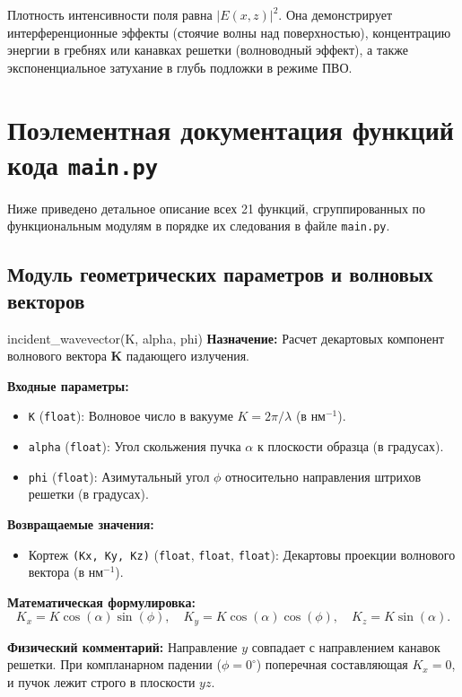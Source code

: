 \documentclass[a4paper,11pt]{article}
\begin{document}
Плотность интенсивности поля равна $|E(x, z)|^2$. Она демонстрирует интерференционные эффекты (стоячие волны над поверхностью), концентрацию энергии в гребнях или канавках решетки (волноводный эффект), а также экспоненциальное затухание в глубь подложки в режиме ПВО.

\newpage
\section{Поэлементная документация функций кода \texttt{main.py}}

Ниже приведено детальное описание всех 21 функций, сгруппированных по функциональным модулям в порядке их следования в файле \texttt{main.py}.

\subsection{Модуль геометрических параметров и волновых векторов}

\begin{funcbox}{incident\_wavevector(K, alpha, phi)}
\textbf{Назначение:} Расчет декартовых компонент волнового вектора $\mathbf{K}$ падающего излучения.

\textbf{Входные параметры:}
\begin{itemize}
    \item \texttt{K} (\texttt{float}): Волновое число в вакууме $K = 2\pi / \lambda$ (в $\text{нм}^{-1}$).
    \item \texttt{alpha} (\texttt{float}): Угол скольжения пучка $\alpha$ к плоскости образца (в градусах).
    \item \texttt{phi} (\texttt{float}): Азимутальный угол $\phi$ относительно направления штрихов решетки (в градусах).
\end{itemize}

\textbf{Возвращаемые значения:}
\begin{itemize}
    \item Кортеж \texttt{(Kx, Ky, Kz)} (\texttt{float}, \texttt{float}, \texttt{float}): Декартовы проекции волнового вектора (в $\text{нм}^{-1}$).
\end{itemize}

\textbf{Математическая формулировка:}
\begin{equation*}
K_x = K \cos(\alpha) \sin(\phi), \quad K_y = K \cos(\alpha) \cos(\phi), \quad K_z = K \sin(\alpha).
\end{equation*}

\textbf{Физический комментарий:} Направление $y$ совпадает с направлением канавок решетки. При компланарном падении ($\phi = 0^\circ$) поперечная составляющая $K_x = 0$, и пучок лежит строго в плоскости $yz$.
\end{funcbox}
\end{document}
